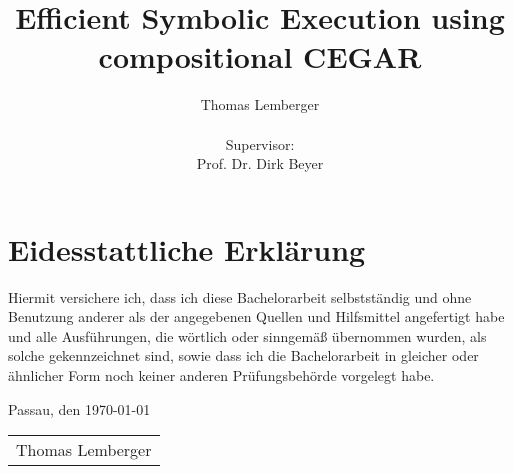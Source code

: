\documentclass[abstracton,bibliography=totoc,version=last,fontsize=12pt,BCOR=5mm,footinclude=false,a4paper,final,ngerman]{scrreprt}
\providecommand{\frontmatter}{}
\providecommand{\mainmatter}{}
\providecommand{\backmatter}{}
\begin{document}

\frontmatter

\titlehead{
\centering
\texttt{[image: unilogo]}
}

\subject{Bachelor's Thesis\\in Computer Science}
\title{Efficient Symbolic Execution using compositional CEGAR}
\author{{\LARGE Thomas Lemberger}\\\mbox{}\\Supervisor:\\Prof. Dr. Dirk Beyer\\}
\publishers{\today}
\date{}

\maketitle

\begin{abstract}
\begin{addmargin}{1.5cm}

\end{addmargin}
\end{abstract}

\setcounter{tocdepth}{5}
\setcounter{secnumdepth}{5}
\tableofcontents
\listofalgorithms
\listoffigures
\listoftables

\mainmatter






%




\backmatter
\appendix


\chapter*{Eidesstattliche Erkl\"{a}rung}
\thispagestyle{empty}
Hiermit versichere ich, dass ich diese Bachelorarbeit selbstst\"{a}ndig und ohne
Benutzung anderer als der angegebenen Quellen und Hilfsmittel angefertigt habe
und alle Ausf\"{u}hrungen, die w\"{o}rtlich oder sinngem\"{a}\ss{} \"{u}bernommen wurden, als
solche gekennzeichnet sind, sowie dass ich die Bachelorarbeit in gleicher oder
\"{a}hnlicher Form noch keiner anderen Pr\"{u}fungsbeh\"{o}rde vorgelegt habe.

\bigskip

\noindent Passau, den \today

\bigskip\bigskip\bigskip
\noindent \begin{tabular}{c}
\hspace*{0.5\linewidth}\\
\hline
Thomas Lemberger
\end{tabular}
\end{document}
